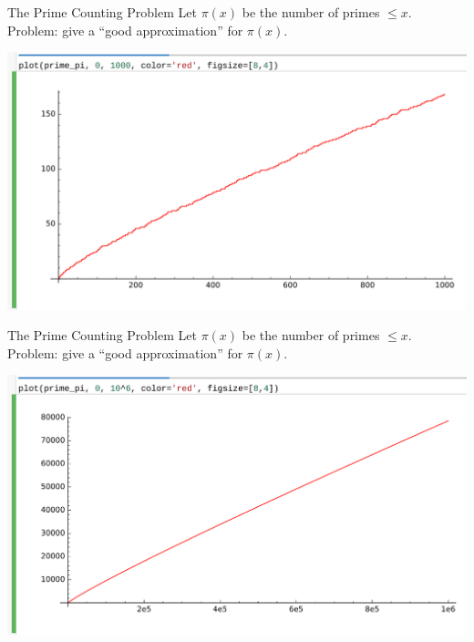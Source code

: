 \documentclass{beamer}
\begin{document}
\begin{frame}{The Prime Counting Problem}
  Let $\pi(x)$ be the number of primes $\leq x$.\\
  Problem: give a ``good approximation'' for $\pi(x)$.
  \vfill

  \includegraphics[width=.98\textwidth]{pics/prime-pi-1000.png}

\end{frame}

\begin{frame}{The Prime Counting Problem}
  Let $\pi(x)$ be the number of primes $\leq x$.\\
  Problem: give a ``good approximation'' for $\pi(x)$.
  \vfill

  \includegraphics[width=.98\textwidth]{pics/prime-pi-1000000.png}

\end{frame}
\end{document}
